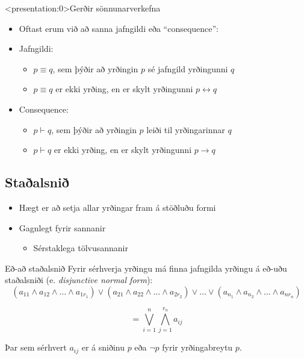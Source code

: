 \documentclass[handout]{beamer}
\begin{document}
\begin{frame}<presentation:0>{Gerðir sönnunarverkefna}
\begin{itemize}
 \item Oftast erum við að sanna jafngildi eða ``consequence'':
 \item Jafngildi:
 \begin{itemize}
  \item $p \equiv q$, sem þýðir að yrðingin $p$ sé jafngild yrðingunni $q$
  \item $p \equiv q$ er ekki yrðing, en er skylt yrðingunni $p \leftrightarrow q$
 \end{itemize}
 \item Consequence:
 \begin{itemize}
  \item $p \vdash q$, sem þýðir að yrðingin $p$ leiði til yrðingarinnar $q$
  \item $p \vdash q$ er ekki yrðing, en er skylt yrðingunni $p \rightarrow q$
 \end{itemize}
\end{itemize}
\end{frame}


\subsection{Staðalsnið}

\begin{frame}
\begin{itemize}
 \item Hægt er að setja allar yrðingar fram á stöðluðu formi
 \item Gagnlegt fyrir sannanir
 \begin{itemize}
  \item Sérstaklega tölvusannanir
 \end{itemize}
\end{itemize}
\end{frame}


\begin{frame}{Eð-að staðalsnið}
Fyrir sérhverja yrðingu má finna jafngilda yrðingu á eð-uðu staðalsniði (e. \emph{disjunctive normal form}):
\[
 (a_{11} \land a_{12} \land \ldots \land a_{1r_1} ) \lor (a_{21} \land a_{22} \land \ldots \land a_{2r_2} ) \lor \ldots \lor (a_{n_1} \land a_{n_2} \land \ldots \land a_{nr_n} )
\]

\[
 = \bigvee_{i=1}^n \bigwedge_{j=1}^{r_n}a_{ij}
\]

Þar sem sérhvert $a_{ij}$ er á sniðinu $p$ eða $\lnot p$ fyrir yrðingabreytu $p$.
\end{frame}
\end{document}
